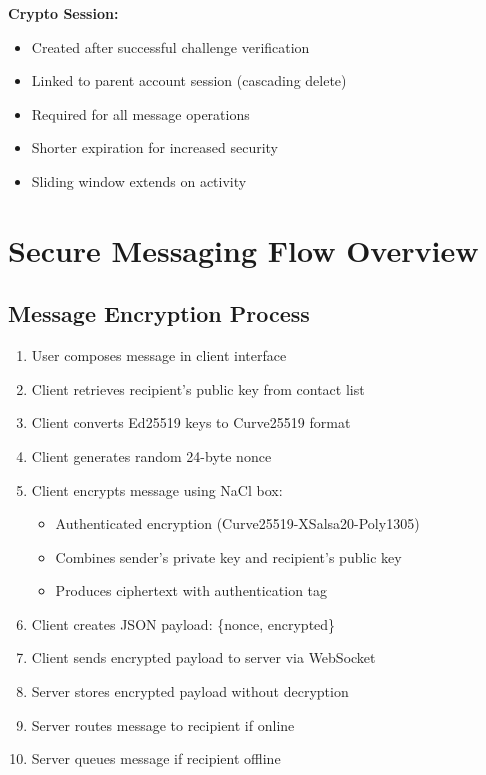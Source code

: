 \textbf{Crypto Session:}
\begin{itemize}
    \item Created after successful challenge verification
    \item Linked to parent account session (cascading delete)
    \item Required for all message operations
    \item Shorter expiration for increased security
    \item Sliding window extends on activity
\end{itemize}

\section{Secure Messaging Flow Overview}

\subsection{Message Encryption Process}

\begin{enumerate}
    \item User composes message in client interface
    \item Client retrieves recipient's public key from contact list
    \item Client converts Ed25519 keys to Curve25519 format
    \item Client generates random 24-byte nonce
    \item Client encrypts message using NaCl box:
    \begin{itemize}
        \item Authenticated encryption (Curve25519-XSalsa20-Poly1305)
        \item Combines sender's private key and recipient's public key
        \item Produces ciphertext with authentication tag
    \end{itemize}
    \item Client creates JSON payload: \{nonce, encrypted\}
    \item Client sends encrypted payload to server via WebSocket
    \item Server stores encrypted payload without decryption
    \item Server routes message to recipient if online
    \item Server queues message if recipient offline
\end{enumerate}

